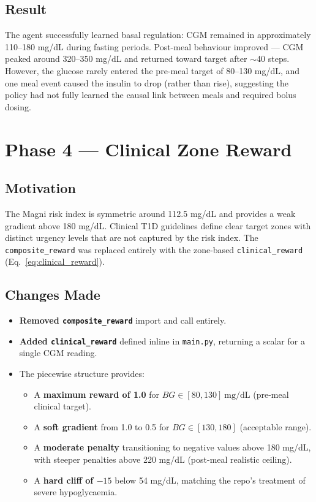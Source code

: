 \documentclass[11pt,a4paper]{article}
\begin{document}
\subsection{Result}
The agent successfully learned basal regulation: CGM remained in approximately
110--180 mg/dL during fasting periods. Post-meal behaviour improved — CGM peaked around
320--350 mg/dL and returned toward target after $\sim$40 steps. However, the glucose
rarely entered the pre-meal target of 80--130 mg/dL, and one meal event caused the
insulin to drop (rather than rise), suggesting the policy had not fully learned the
causal link between meals and required bolus dosing.

\section{Phase 4 — Clinical Zone Reward}

\subsection{Motivation}
The Magni risk index is symmetric around 112.5 mg/dL and provides a weak gradient
above 180 mg/dL. Clinical T1D guidelines define clear target zones with distinct
urgency levels that are not captured by the risk index. The \texttt{composite\_reward}
was replaced entirely with the zone-based \texttt{clinical\_reward} (Eq.~\ref{eq:clinical_reward}).

\subsection{Changes Made}
\begin{itemize}
    \item \textbf{Removed \texttt{composite\_reward}} import and call entirely.
    \item \textbf{Added \texttt{clinical\_reward}} defined inline in \texttt{main.py},
          returning a scalar for a single CGM reading.
    \item The piecewise structure provides:
    \begin{itemize}
        \item A \textbf{maximum reward of 1.0} for $BG \in [80, 130]\ \text{mg/dL}$
              (pre-meal clinical target).
        \item A \textbf{soft gradient} from 1.0 to 0.5 for $BG \in [130, 180]$
              (acceptable range).
        \item A \textbf{moderate penalty} transitioning to negative values above 180 mg/dL,
              with steeper penalties above 220 mg/dL (post-meal realistic ceiling).
        \item A \textbf{hard cliff of $-15$} below 54 mg/dL, matching the repo's
              treatment of severe hypoglycaemia.
    \end{itemize}
\end{itemize}
\end{document}
